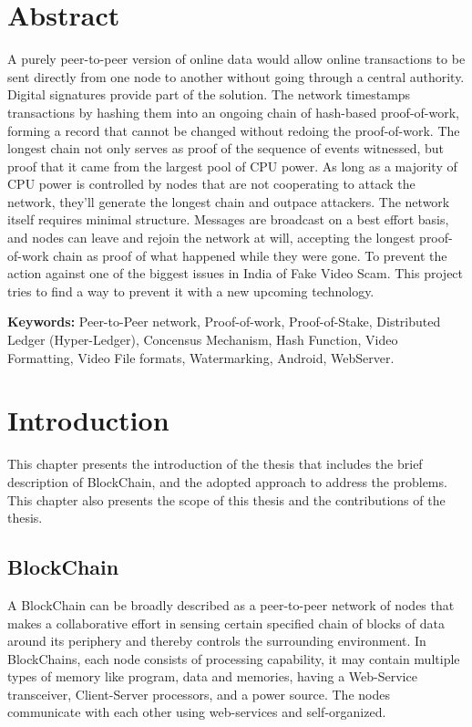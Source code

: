 \documentclass[a4paper,12pt]{report}
\begin{document}
\chapter*{Abstract}
A purely peer-to-peer version of online data would allow online transactions to be sent directly from one node to another without going through a central authority. Digital signatures provide part of the solution.
The network timestamps transactions by hashing them into an ongoing chain of hash-based proof-of-work, forming a record that cannot be changed without redoing the proof-of-work. The longest chain not only serves as proof of the sequence of events witnessed, but proof that it came from the largest pool of CPU power. As long as a majority of CPU power is controlled by nodes that are not cooperating to attack the network, they'll generate the longest chain and outpace attackers. The network itself requires minimal structure. Messages are broadcast on a best effort basis, and nodes can leave and rejoin the network at will, accepting the longest proof-of-work chain as proof of what happened while they were gone.
To prevent the action against one of the biggest issues in India of Fake Video Scam. This project tries to find a way to prevent it with a new upcoming technology.

\textbf{Keywords:} Peer-to-Peer network, Proof-of-work, Proof-of-Stake, Distributed Ledger (Hyper-Ledger), Concensus Mechanism, Hash Function, Video Formatting, Video File formats, Watermarking, Android, WebServer.


\pagebreak \tableofcontents


\afterpage{\null\newpage}

\chapter{Introduction}
\label{Ch1} \setcounter{page}{1} 
\bigskip
\bigskip
\bigskip
This chapter presents the introduction of the thesis that includes the brief description of BlockChain, and the adopted approach to address the problems. This chapter also presents the scope of this thesis and the contributions of the thesis.

\section{BlockChain}
A BlockChain can be broadly described as a peer-to-peer network of nodes that makes a collaborative effort in sensing certain specified chain of blocks of data around its periphery and thereby controls the surrounding environment. In BlockChains, each node consists of processing capability, it may contain multiple types of memory like program, data and memories, having a Web-Service transceiver, Client-Server processors, and a power source. The nodes communicate with each other using web-services and self-organized.
\end{document}
